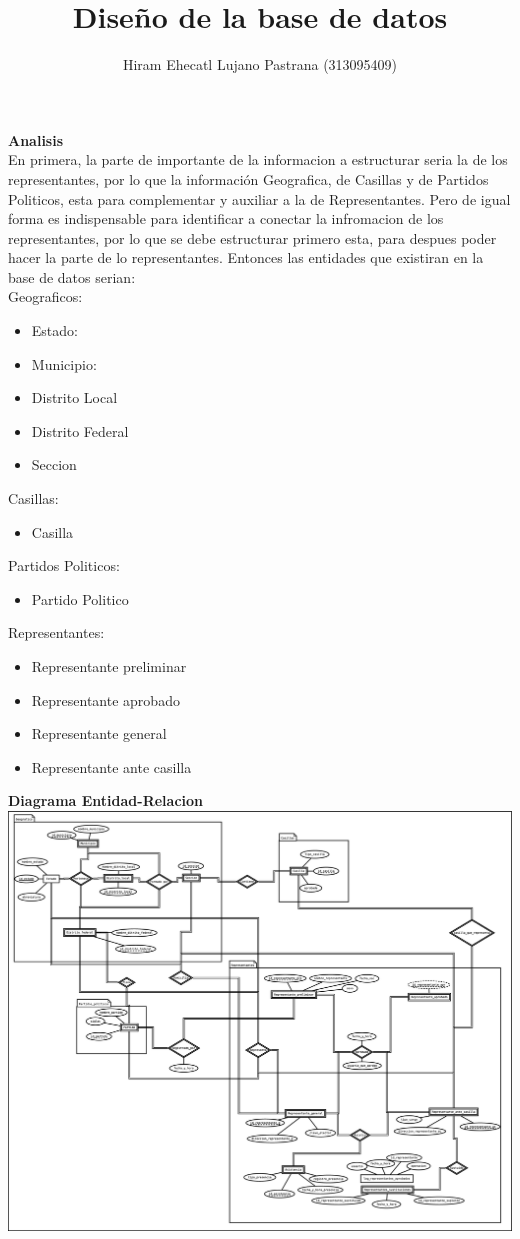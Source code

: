 \documentclass[a4paper,twoside,11pt]{article}
\title{Diseño de la base de datos}
\author{Hiram Ehecatl Lujano Pastrana (313095409)}
\begin{document}
\maketitle

\textbf{Analisis}\\
En primera, la parte de importante de la informacion a estructurar seria
la de los representantes, por lo que la información Geografica, de
Casillas y de Partidos Politicos, esta para complementar y auxiliar
a la de Representantes.
Pero de igual forma es indispensable para identificar a conectar la
infromacion de los representantes, por lo que se debe estructurar primero
esta, para despues poder hacer la parte de lo representantes.
Entonces las entidades que existiran en la base de datos serian:\\
Geograficos:
\begin{itemize}
  \item Estado:
  \item Municipio:
  \item Distrito Local
  \item Distrito Federal
  \item Seccion
\end{itemize}
Casillas:
\begin{itemize}
  \item Casilla
\end{itemize}
Partidos Politicos:
\begin{itemize}
  \item Partido Politico
\end{itemize}
Representantes:
\begin{itemize}
  \item Representante preliminar
  \item Representante aprobado
  \item Representante general
  \item Representante ante casilla
\end{itemize}
\textbf{Diagrama Entidad-Relacion}\\
\includegraphics[scale=0.15]{e-r}
\end{document}
